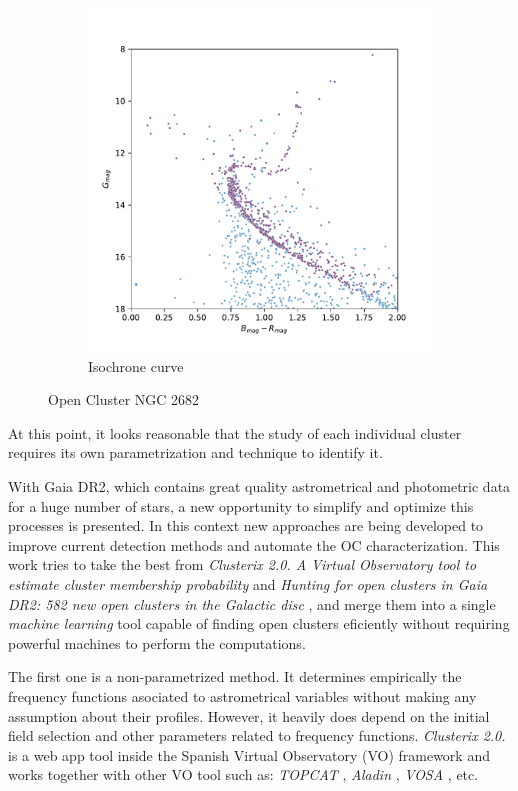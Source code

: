 \documentclass[11pt, a4paper, english]{book}
\begin{document}
\begin{figure}[htbp]
\begin{subfigure}[t]{0.45\textwidth}
    \includegraphics[width=\textwidth]{../figures/isochrone_ngc_2682.pdf}
    \caption{Isochrone curve}
    \label{fig:parallax_ngc_2682}
  \end{subfigure}
  \caption{Open Cluster NGC 2682}
\end{figure}

At this point, it looks reasonable that the study of each individual cluster requires its own parametrization and technique
to identify it.

With Gaia DR2, which contains great quality astrometrical and photometric data for a huge number of stars,
a new opportunity to simplify and optimize this processes is presented.
In this context new approaches are being developed to improve current detection methods and automate the OC characterization.
This work tries to take the best from \emph{Clusterix 2.0. A Virtual Observatory tool to estimate cluster membership probability}
\cite[]{balaguer2020clusterix} and \emph{Hunting for open clusters in Gaia DR2: 582 new open clusters
in the Galactic disc} \cite[]{castro2020hunting}, and merge them into a single \emph{machine learning}
tool capable of finding open clusters eficiently without requiring powerful machines to perform the computations.

The first one is a non-parametrized method. It determines empirically the frequency functions asociated to astrometrical variables
without making any assumption about their profiles. However, it heavily does depend on the initial field selection and other
parameters related to frequency functions. \emph{Clusterix 2.0.} is a web app tool inside the Spanish Virtual Observatory
(VO) framework and works together with other VO tool such as:
\emph{TOPCAT} \cite[][\url{http://www.starlink.ac.uk/topcat/}]{taylor2005topcat},
\emph{Aladin} \cite[][\url{https://aladin.u-strasbg.fr/aladin.gml}]{bonnarel2000aladin},
\emph{VOSA} \cite[][\url{http://svo2.cab.inta-csic.es/theory/vosa/}]{bayo2008vosa}, etc.
\end{document}
